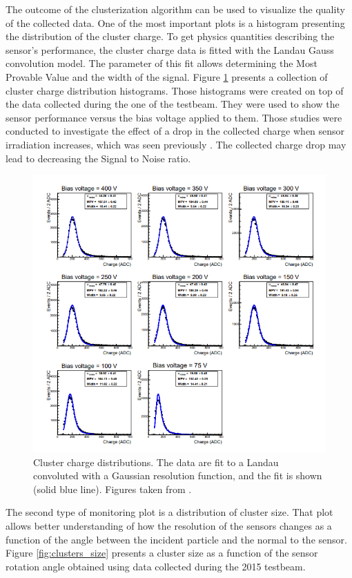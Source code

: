 The outcome of the clusterization algorithm can be used to visualize the quality of the collected data. One of the most important plots is a histogram presenting the distribution of the cluster charge. To get physics quantities describing the sensor's performance, the cluster charge data is fitted with the Landau Gauss convolution model. The parameter of this fit allows determining the Most Provable Value and the width of the signal.  Figure \ref{fig:clusters_with_landau} presents a collection of cluster charge distribution histograms. Those histograms were created on top of the data collected during the one of the testbeam. They were used to show the sensor performance versus the bias voltage applied to them.  Those studies were conducted to investigate the effect of a drop in the collected charge when sensor irradiation increases, which was seen previously \cite{irradiation}. The collected charge drop may lead to decreasing the Signal to Noise ratio.  


\begin{figure}
\centering
\includegraphics{figures/landau.png}
\caption{Cluster charge distributions. The data are fit to a Landau 
convoluted with a Gaussian resolution function, and the fit is shown (solid blue line). Figures taken from \cite{tb1}. 
}\label{fig:clusters_with_landau}
\end{figure}

The second type of monitoring plot is a distribution of cluster size. That plot allows better understanding of how the resolution of the sensors changes as a function of the angle between the incident particle and the normal to the sensor. Figure \ref{fig:clusters_size} presents a cluster size as a function of the sensor rotation angle obtained using data collected during the 2015 testbeam. 


